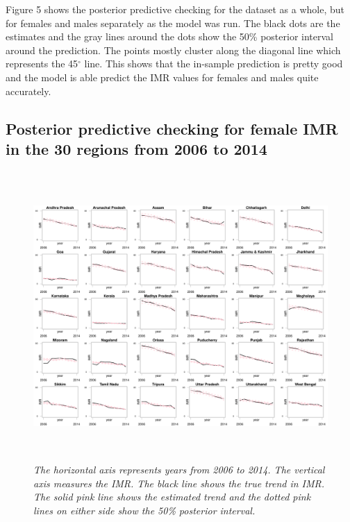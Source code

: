 \documentclass{article}
\begin{document}
Figure 5 shows the posterior predictive checking for the dataset as a whole, but for females and males separately as the model was run. The black dots are the estimates and the gray lines around the dots show the 50\% posterior interval around the prediction. The points mostly cluster along the diagonal line which represents the 45$^{\circ}$ line. This shows that the in-sample prediction is pretty good and the model is able predict the IMR values for females and males quite accurately. 

\subsection{Posterior predictive checking for female IMR in the 30 regions from 2006 to 2014}
\begin{figure}[H]
   \begin{center}
   \includegraphics[height = 11cm, width = 15cm]{fem_ppc.pdf}
   \end{center}
   \caption{\emph{The horizontal axis represents years from 2006 to 2014. The vertical axis measures the IMR. The black line shows the true trend in IMR. The solid pink line shows the estimated trend and the dotted pink lines on either side show the 50\% posterior interval.}}
\end{figure}
\end{document}
